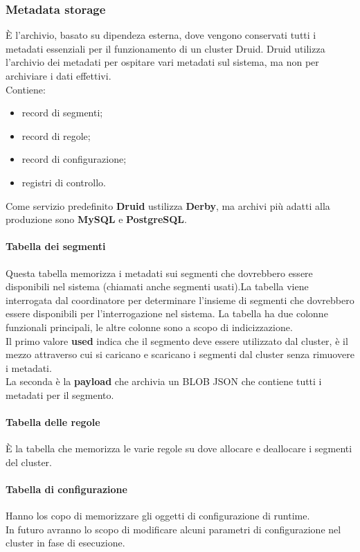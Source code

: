 \documentclass{article}
\begin{document}
\subsubsection{Metadata storage}
È l'archivio, basato su dipendeza esterna, dove vengono conservati tutti i metadati essenziali per il funzionamento di un cluster Druid.
Druid utilizza l'archivio dei metadati per ospitare vari metadati sul sistema, ma non per archiviare i dati effettivi.\\
Contiene: 
\begin{itemize}
    \item record di segmenti;
    \item record di regole;
    \item record di configurazione;
    \item registri di controllo.
\end{itemize}
Come servizio predefinito \textbf{Druid} ustilizza \textbf{Derby}, ma archivi più adatti alla produzione sono \textbf{MySQL} e \textbf{PostgreSQL}.
\paragraph{Tabella dei segmenti}
Questa tabella memorizza i metadati sui segmenti che dovrebbero essere disponibili nel sistema (chiamati anche segmenti usati).La tabella viene interrogata dal coordinatore per determinare l'insieme di segmenti che dovrebbero essere disponibili per l'interrogazione nel sistema. La tabella ha due colonne funzionali principali, le altre colonne sono a scopo di indicizzazione.\\
Il primo valore \textbf{used} indica che il segmento deve essere utilizzato dal cluster, è il mezzo attraverso cui si caricano e scaricano i segmenti dal cluster senza rimuovere i metadati.\\
La seconda è la  \textbf{payload} che archivia un BLOB JSON che contiene tutti i metadati per il segmento.
\paragraph{Tabella delle regole}
È la tabella che memorizza le varie regole su dove allocare e deallocare i segmenti del cluster.
\paragraph{Tabella di configurazione}
Hanno los copo di memorizzare  gli oggetti di configurazione di runtime.\\
In futuro avranno lo scopo di modificare alcuni parametri di configurazione nel cluster in fase di esecuzione.
\end{document}
